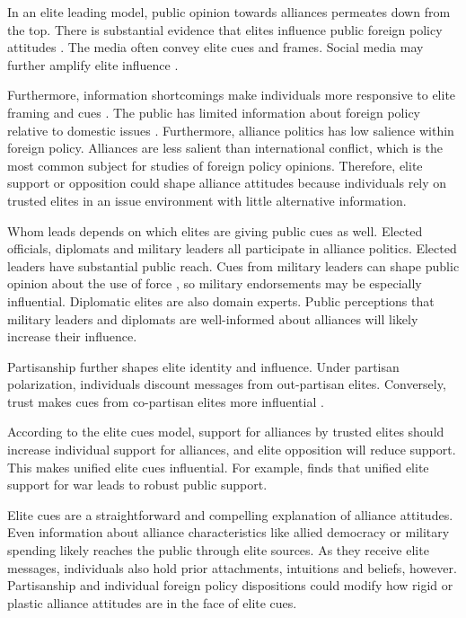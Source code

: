 \documentclass[12pt]{article}
\begin{document}
In an elite leading model, public opinion towards alliances permeates down from the top.
There is substantial evidence that elites influence public foreign policy attitudes \citep{BaumPotter2008}. 
The media often convey elite cues and frames.
Social media may further amplify elite influence \citep{BaumPotter2019}.   


Furthermore, information shortcomings make individuals more responsive to elite framing and cues \citep{Druckman2001, Peterson2017}.  
The public has limited information about foreign policy relative to domestic issues \citep{BaumPotter2008}.
Furthermore, alliance politics has low salience within foreign policy. 
Alliances are less salient than international conflict, which is the most common subject for studies of foreign policy opinions. 
Therefore, elite support or opposition could shape alliance attitudes because individuals rely on trusted elites in an issue environment with little alternative information. 


Whom leads depends on which elites are giving public cues as well.
Elected officials, diplomats and military leaders all participate in alliance politics.
Elected leaders have substantial public reach.  
Cues from military leaders can shape public opinion about the use of force \citep{Golbyetal2018}, so military endorsements may be especially influential. 
Diplomatic elites are also domain experts. 
Public perceptions that military leaders and diplomats are well-informed about alliances will likely increase their influence. 


Partisanship further shapes elite identity and influence.
Under partisan polarization, individuals discount messages from out-partisan elites. 
Conversely, trust makes cues from co-partisan elites more influential \citep{Druckmanetal2013}. 


According to the elite cues model, support for alliances by trusted elites should increase individual support for alliances, and elite opposition will reduce support.  
This makes unified elite cues influential.
For example, \citet{Berinsky2007} finds that unified elite support for war leads to robust public support. 


Elite cues are a straightforward and compelling explanation of alliance attitudes.
Even information about alliance characteristics like allied democracy or military spending likely reaches the public through elite sources. 
As they receive elite messages, individuals also hold prior attachments, intuitions and beliefs, however.
Partisanship and individual foreign policy dispositions could modify how rigid or plastic alliance attitudes are in the face of elite cues. 
\end{document}
